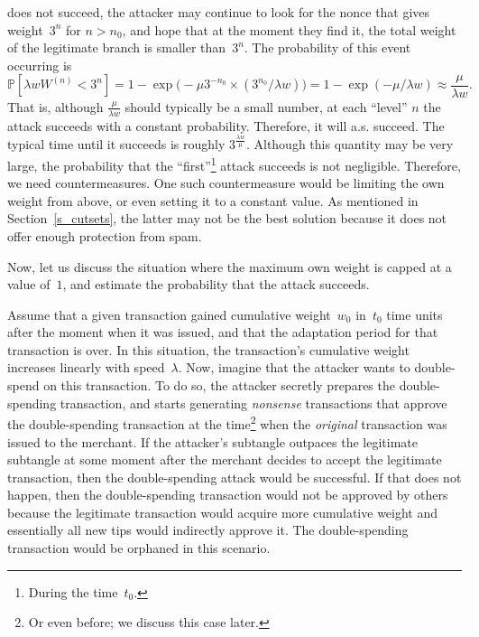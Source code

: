 \documentclass[12pt]{article}
\newcommand{\IP}{\mathbb{P}}
\begin{document}
does not succeed, the attacker may continue to look for the nonce
that gives weight~$3^n$ for $n>n_0$, and hope that at the moment
they find it, the total weight of the legitimate branch is smaller
than~$3^n$. The probability of this event occurring is
\[
 \IP[\lambda w W^{(n)}<3^n]
=1-\exp\big(-\mu 3^{-n_0}\times (3^{n_0}/\lambda w)\big)
  = 1-\exp(- \mu/\lambda w)
  \approx \frac{\mu}{\lambda w}.
\]
That is, although $\frac{\mu}{\lambda w}$ should typically
be a small number, at each ``level'' $n$ the attack succeeds with a constant
probability. Therefore, it will a.s. succeed. 
The typical time until it succeeds 
is roughly $3^\frac{\lambda w}{\mu}$. Although this quantity
may be very large, the probability that the 
``first''\footnote{During the time~$t_0$.} attack succeeds 
is not negligible. 
Therefore, we need countermeasures. One such countermeasure 
would be limiting the own weight from above, or even setting 
it to a constant value. As mentioned in Section~\ref{s_cutsets}, the 
latter may not be the best solution because it does not offer 
enough protection from spam.

\medskip

Now, let us discuss the situation
where the maximum own weight is capped at a value of~$1$,
 and estimate the probability that the attack succeeds.

Assume that a given transaction gained
 cumulative weight~$w_0$ in~$t_0$ time units after the moment
when it was issued, and
that the adaptation period for 
that transaction is over. In this situation, the transaction's
 cumulative weight
increases linearly with speed~$\lambda $. Now, 
imagine that the attacker wants to double-spend on this transaction.
To do so, the attacker secretly prepares the double-spending transaction,
 and starts generating \emph{nonsense} transactions 
that approve the double-spending transaction at the 
time\footnote{Or even before; we discuss this case later.}
 when the \emph{original} transaction was issued to the merchant.
If 
the attacker's subtangle outpaces the legitimate
subtangle at some moment after the merchant decides to accept 
the legitimate transaction, then the double-spending attack would be successful.
If that does not happen, then
the double-spending transaction 
would not be approved by others 
because the legitimate transaction would acquire more cumulative 
weight and essentially all new tips would indirectly 
approve it. The double-spending transaction would be orphaned in 
this scenario.
\end{document}
